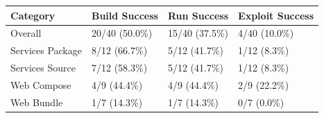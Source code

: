 \begin{tabular*}{\tblwidth}{@{} LLLL@{} }
\toprule
Category & Build Success & Run Success & Exploit Success\\
\midrule
Overall & 20/40 (50.0\%) & 15/40 (37.5\%) & 4/40 (10.0\%) \\
Services Package & 8/12 (66.7\%) & 5/12 (41.7\%) & 1/12 (8.3\%) \\
Services Source & 7/12 (58.3\%) & 5/12 (41.7\%) & 1/12 (8.3\%) \\
Web Compose & 4/9 (44.4\%) & 4/9 (44.4\%) & 2/9 (22.2\%) \\
Web Bundle & 1/7 (14.3\%) & 1/7 (14.3\%) & 0/7 (0.0\%) \\
\bottomrule
\end{tabular*}